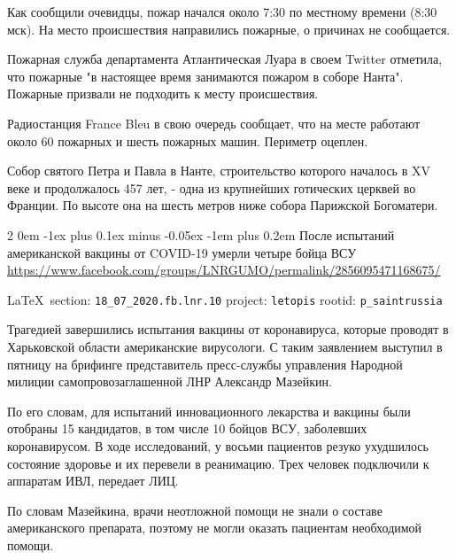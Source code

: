 \documentclass[a4paper,11pt]{extreport}
\makeatletter
\renewcommand\subsection{%
  \clearpage
    \@startsection{subsection}%
    {2}%
    {0em}%
    {-1ex plus 0.1ex minus -0.05ex}%
    {-1em plus 0.2em}%
    {\scshape\bfseries\Large}%
}
\makeatother
\begin{document}
Как сообщили очевидцы, пожар начался около 7:30 по местному времени (8:30 мск).
На место происшествия направились пожарные, о причинах не сообщается.

Пожарная служба департамента Атлантическая Луара в своем Twitter отметила, что
пожарные "в настоящее время занимаются пожаром в соборе Нанта". Пожарные
призвали не подходить к месту происшествия.

Радиостанция France Bleu в свою очередь сообщает, что на месте работают около
60 пожарных и шесть пожарных машин. Периметр оцеплен.

Собор святого Петра и Павла в Нанте, строительство которого началось в XV веке
и продолжалось 457 лет, - одна из крупнейших готических церквей во Франции. По
высоте она на шесть метров ниже собора Парижской Богоматери. 
 
 
\subsection{После испытаний американской вакцины от COVID-19 умерли четыре бойца ВСУ  }
\label{sec:18_07_2020.fb.lnr.10}
\url{https://www.facebook.com/groups/LNRGUMO/permalink/2856095471168675/}
  
\vspace{0.5cm}
{\small\LaTeX~section: \verb|18_07_2020.fb.lnr.10| project: \verb|letopis| rootid: \verb|p_saintrussia|}
\vspace{0.5cm}


Трагедией завершились испытания вакцины от коронавируса, которые проводят в
Харьковской области американские вирусологи. С таким заявлением выступил в
пятницу на брифинге представитель пресс-службы управления Народной милиции
самопровозаглашенной ЛНР Александр Мазейкин.

По его словам, для испытаний инновационного лекарства и вакцины были отобраны
15 кандидатов, в том числе 10 бойцов ВСУ, заболевших коронавирусом. В ходе
исследований, у восьми пациентов резуко ухудшилось состояние здоровье и их
перевели в реанимацию. Трех человек подключили к аппаратам ИВЛ, передает ЛИЦ.

По словам Мазейкина, врачи неотложной помощи не знали о составе американского
препарата, поэтому не могли оказать пациентам необходимой помощи.
\end{document}
